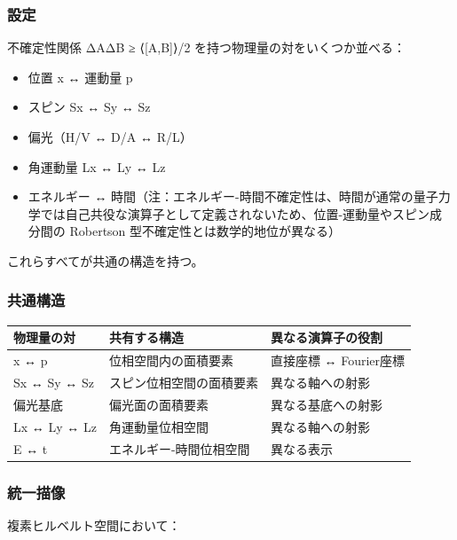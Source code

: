 \documentclass[
]{ltjsarticle}
\newcounter{none} %
\providecommand{\tightlist}{%
  \setlength{\itemsep}{0pt}\setlength{\parskip}{0pt}}
\begin{document}
\subsubsection{設定}\label{ux8a2dux5b9a-4}

不確定性関係 ΔAΔB ≥ \textbar⟨{[}A,B{]}⟩\textbar/2
を持つ物理量の対をいくつか並べる：

\begin{itemize}
\tightlist
\item
  位置 x ↔ 運動量 p
\item
  スピン Sx ↔ Sy ↔ Sz
\item
  偏光（H/V ↔ D/A ↔ R/L）
\item
  角運動量 Lx ↔ Ly ↔ Lz
\item
  エネルギー ↔
  時間（注：エネルギー-時間不確定性は、時間が通常の量子力学では自己共役な演算子として定義されないため、位置-運動量やスピン成分間の
  Robertson 型不確定性とは数学的地位が異なる）
\end{itemize}

これらすべてが共通の構造を持つ。

\subsubsection{共通構造}\label{ux5171ux901aux69cbux9020}

{\def\LTcaptype{none} %
\begin{longtable}[]{@{}lll@{}}
\toprule\noalign{}
物理量の対 & 共有する構造 & 異なる演算子の役割 \\
\midrule\noalign{}
\endhead
\bottomrule\noalign{}
\endlastfoot
x ↔ p & 位相空間内の面積要素 & 直接座標 ↔ Fourier座標 \\
Sx ↔ Sy ↔ Sz & スピン位相空間の面積要素 & 異なる軸への射影 \\
偏光基底 & 偏光面の面積要素 & 異なる基底への射影 \\
Lx ↔ Ly ↔ Lz & 角運動量位相空間 & 異なる軸への射影 \\
E ↔ t & エネルギー-時間位相空間 & 異なる表示 \\
\end{longtable}
}

\subsubsection{統一描像}\label{ux7d71ux4e00ux63cfux50cf}

複素ヒルベルト空間において：
\end{document}
